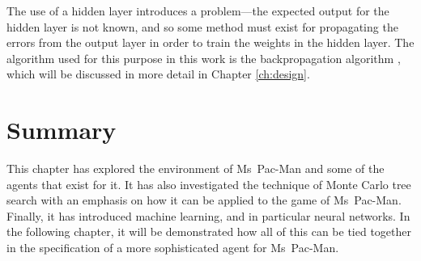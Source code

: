 The use of a hidden layer introduces a problem---the expected output for the hidden layer is not known, and so some method must exist for propagating the errors from the output layer in order to train the weights in the hidden layer.  The algorithm used for this purpose in this work is the backpropagation algorithm \cite[pp. 134--149]{Aleksander1995}, which will be discussed in more detail in Chapter \ref{ch:design}.

\section{Summary}

This chapter has explored the environment of Ms~Pac-Man and some of the agents that exist for it.  It has also investigated the technique of Monte Carlo tree search with an emphasis on how it can be applied to the game of Ms~Pac-Man.  Finally, it has introduced machine learning, and in particular neural networks.  In the following chapter, it will be demonstrated how all of this can be tied together in the specification of a more sophisticated agent for Ms~Pac-Man.
